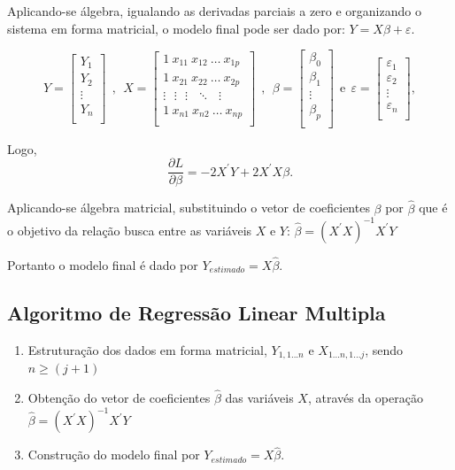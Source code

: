 \documentclass[	12pt, Times, openright, twoside, a4paper, english, brazil]{abntex2}
\begin{document}
          Aplicando-se álgebra, igualando as derivadas parciais a zero e organizando o sistema em forma matricial, o modelo final pode ser dado por: $Y=X\beta+\varepsilon$.
          
          $$Y=\left[\begin{array}{c}Y_1\\Y_2\\\vdots\\Y_n\\\end{array} \right]~~,~~X=\left[\begin{array}{ccccc}1~x_{11}~ x_{12}~\ldots~x_{1p}\\1~x_{21}~x_{22}~\ldots~x_{2p}\\\vdots~~~\vdots~~~\vdots~~~\ddots~~~\vdots\\1~x_{n1}~x_{n2}~\ldots~x_{np}\\\end{array} \right]~~,~~\beta=\left[ \begin{array}{c}\beta_0\\\beta_1\\\vdots\\\beta_p\\\end{array} \right]~~\mbox{e}~~ \varepsilon=\left[ \begin{array}{c}\varepsilon_1\\\varepsilon_2\\\vdots\\\varepsilon_n\\\end{array}\right],$$
          
          Logo, $$\frac{\partial L}{\partial\beta}=-2X^\prime Y+2X^\prime X\beta.$$
          
          Aplicando-se álgebra matricial, substituindo o vetor de coeficientes $\beta$ por $\widehat\beta$ que é o objetivo da relação busca entre as variáveis $X$ e $Y$:
          $\widehat{\beta}=(X^\prime X)^{-1} X^\prime Y$
          
          Portanto o modelo final é dado por $Y_{estimado} = X\widehat{\beta}$.
          
        \subsection{Algoritmo de Regressão Linear Multipla}
        
            \begin{enumerate}
                  \item Estruturação dos dados em forma matricial, $Y_{1,1...n}$ e $X_{1...n,1...j}$, sendo $n \geq (j+1)$ \\
                  \item Obtenção do vetor de coeficientes $\widehat{\beta}$ das variáveis $X$, através da operação $\widehat{\beta}=(X^\prime X)^{-1} X^\prime Y$
                  \item Construção do modelo final por $Y_{estimado} = X\widehat{\beta}$.
            \end{enumerate}
\end{document}
